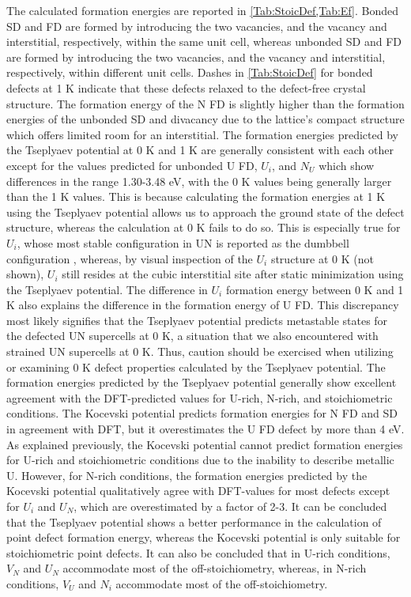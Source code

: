 \documentclass[preprint, 12pt]{elsarticle}
\begin{document}
The calculated formation energies are reported in \cref{Tab:StoicDef,Tab:Ef}. Bonded SD and FD are formed by introducing the two vacancies, and the vacancy and interstitial, respectively, within the same unit cell, whereas unbonded SD and FD are formed by introducing the two vacancies, and the vacancy and interstitial, respectively, within different unit cells. Dashes in \cref{Tab:StoicDef} for bonded defects at 1 K indicate that these defects relaxed to the defect-free crystal structure. The formation energy of the N FD is slightly higher than the formation energies of the unbonded SD and divacancy due to the lattice's compact structure which offers limited room for an interstitial. The formation energies predicted by the Tseplyaev potential at 0 K and 1 K are generally consistent with each other except for the values predicted for unbonded U FD, $U_i$, and $N_U$ which show differences in the range 1.30-3.48 eV, with the 0 K values being generally larger than the 1 K values. This is because calculating the formation energies at 1 K using the Tseplyaev potential allows us to approach the ground state of the defect structure, whereas the calculation at 0 K fails to do so. This is especially true for $U_i$, whose most stable configuration in UN is reported as the dumbbell configuration \cite{Kuksin2016}, whereas, by visual inspection of the $U_i$ structure at 0 K (not shown), $U_i$ still resides at the cubic interstitial site after static minimization using the Tseplyaev potential. The difference in $U_i$ formation energy between 0 K and 1 K also explains the difference in the formation energy of U FD. This discrepancy most likely signifies that the Tseplyaev potential predicts metastable states for the defected UN supercells at 0 K, a situation that we also encountered with strained UN supercells at 0 K. Thus, caution should be exercised when utilizing or examining 0 K defect properties calculated by the Tseplyaev potential. The formation energies predicted by the Tseplyaev potential generally show excellent agreement with the DFT-predicted values for U-rich, N-rich, and stoichiometric conditions. The Kocevski potential predicts formation energies for N FD and SD in agreement with DFT, but it overestimates the U FD defect by more than 4 eV. As explained previously, the Kocevski potential cannot predict formation energies for U-rich and stoichiometric conditions due to the inability to describe metallic U. However, for N-rich conditions, the formation energies predicted by the Kocevski potential qualitatively agree with DFT-values for most defects except for $U_i$ and $U_N$, which are overestimated by a factor of 2-3. It can be concluded that the Tseplyaev potential shows a better performance in the calculation of point defect formation energy, whereas the Kocevski potential is only suitable for stoichiometric point defects. It can also be concluded that in U-rich conditions, $V_N$ and $U_N$ accommodate most of the off-stoichiometry, whereas, in N-rich conditions, $V_U$ and $N_i$ accommodate most of the off-stoichiometry.
\end{document}
